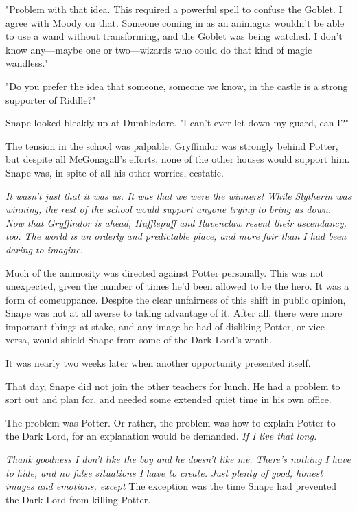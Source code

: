"Problem with that idea. This required a powerful spell to confuse the Goblet. I agree with Moody on that. Someone coming in as an animagus wouldn't be able to use a wand without transforming, and the Goblet was being watched. I don't know any—maybe one or two—wizards who could do that kind of magic wandless."

"Do you prefer the idea that someone, someone we know, in the castle is a strong supporter of Riddle?"

Snape looked bleakly up at Dumbledore. "I can't ever let down my guard, can I?"

The tension in the school was palpable. Gryffindor was strongly behind Potter, but despite all McGonagall's efforts, none of the other houses would support him. Snape was, in spite of all his other worries, ecstatic.

\emph{It wasn't just that it was us. It was that we were the winners! While Slytherin was winning, the rest of the school would support anyone trying to bring us down. Now that Gryffindor is ahead, Hufflepuff and Ravenclaw resent their ascendancy, too. The world is an orderly and predictable place, and more fair than I had been daring to imagine.}

Much of the animosity was directed against Potter personally. This was not unexpected, given the number of times he'd been allowed to be the hero. It was a form of comeuppance. Despite the clear unfairness of this shift in public opinion, Snape was not at all averse to taking advantage of it. After all, there were more important things at stake, and any image he had of disliking Potter, or vice versa, would shield Snape from some of the Dark Lord's wrath.

It was nearly two weeks later when another opportunity presented itself.

That day, Snape did not join the other teachers for lunch. He had a problem to sort out and plan for, and needed some extended quiet time in his own office.

The problem was Potter. Or rather, the problem was how to explain Potter to the Dark Lord, for an explanation would be demanded. \emph{If I live that long.}

\emph{Thank goodness I don't like the boy and he doesn't like me. There's nothing I have to hide, and no false situations I have to create. Just plenty of good, honest images and emotions, except{\el}} The exception was the time Snape had prevented the Dark Lord from killing Potter.

